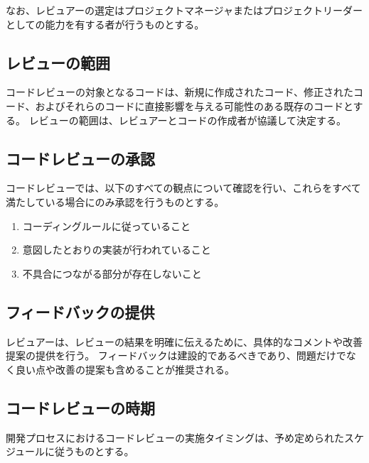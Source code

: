 なお、レビュアーの選定はプロジェクトマネージャまたはプロジェクトリーダーとしての能力を有する者が行うものとする。

\subsection{レビューの範囲}
コードレビューの対象となるコードは、新規に作成されたコード、修正されたコード、およびそれらのコードに直接影響を与える可能性のある既存のコードとする。
レビューの範囲は、レビュアーとコードの作成者が協議して決定する。

\subsection{コードレビューの承認}
コードレビューでは、以下のすべての観点について確認を行い、これらをすべて満たしている場合にのみ承認を行うものとする。
\begin{enumerate}
\item コーディングルールに従っていること
\item 意図したとおりの実装が行われていること
\item 不具合につながる部分が存在しないこと
\end{enumerate}

\subsection{フィードバックの提供}
レビュアーは、レビューの結果を明確に伝えるために、具体的なコメントや改善提案の提供を行う。
フィードバックは建設的であるべきであり、問題だけでなく良い点や改善の提案も含めることが推奨される。

\subsection{コードレビューの時期}
開発プロセスにおけるコードレビューの実施タイミングは、予め定められたスケジュールに従うものとする。


